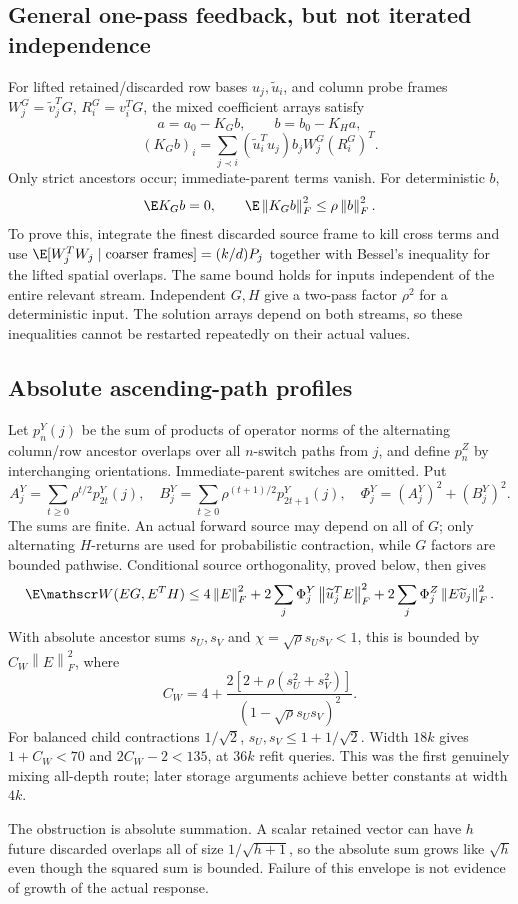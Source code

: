 \documentclass[11pt,oneside,openany,a4paper]{book}
\numberwithin{equation}{chapter}
\theoremstyle{definition}
\theoremstyle{remark}
\newcommand{\F}[1]{\left\lVert#1\right\rVert_F}
\begin{document}
\subsection{General one-pass feedback, but not iterated independence}
For lifted retained/discarded row bases $u_j,\widetilde u_i$, and column probe frames $W_j^G=\widetilde v_j^TG$, $R_i^G=v_i^TG$, the mixed coefficient arrays satisfy
\[
 a=a_0-K_Gb,\qquad b=b_0-K_Ha,
\]
\[
 (K_Gb)_i=\sum_{j\prec i}(\widetilde u_i^Tu_j)b_jW_j^G(R_i^G)^T.
\]
Only strict ancestors occur; immediate-parent terms vanish. For deterministic $b$,
\[
 \E K_Gb=0,\qquad \E\F{K_Gb}^2\le\rho\F b^2.
\]
To prove this, integrate the finest discarded source frame to kill cross terms and use
$\E[W_j^T W_j\mid\text{coarser frames}]=(k/d)P_j$ together with Bessel's inequality for the lifted spatial overlaps. The same bound holds for inputs independent of the entire relevant stream. Independent $G,H$ give a two-pass factor $\rho^2$ for a deterministic input. The solution arrays depend on both streams, so these inequalities cannot be restarted repeatedly on their actual values.

\subsection{Absolute ascending-path profiles}
Let $p_n^Y(j)$ be the sum of products of operator norms of the alternating column/row ancestor overlaps over all $n$-switch paths from $j$, and define $p_n^Z$ by interchanging orientations. Immediate-parent switches are omitted. Put
\[
 A_j^Y=\sum_{t\ge0}\rho^{t/2}p_{2t}^Y(j),\quad
 B_j^Y=\sum_{t\ge0}\rho^{(t+1)/2}p_{2t+1}^Y(j),\quad
 \Phi_j^Y=(A_j^Y)^2+(B_j^Y)^2.
\]
The sums are finite. An actual forward source may depend on all of $G$; only alternating $H$-returns are used for probabilistic contraction, while $G$ factors are bounded pathwise. Conditional source orthogonality, proved below, then gives
\[
 \E\mathscr W(EG,E^TH)\le4\F E^2+
 2\sum_j\Phi_j^Y\F{\widetilde u_j^TE}^2+
 2\sum_j\Phi_j^Z\F{E\widetilde v_j}^2.
\]
With absolute ancestor sums $s_U,s_V$ and $\chi=\sqrt\rho s_Us_V<1$, this is bounded by $C_W\F E^2$, where
\[
 C_W=4+\frac{2[2+\rho(s_U^2+s_V^2)]}{(1-\sqrt\rho s_Us_V)^2}.
\]
For balanced child contractions $1/\sqrt2$, $s_U,s_V\le1+1/\sqrt2$. Width $18k$ gives $1+C_W<70$ and $2C_W-2<135$, at $36k$ refit queries. This was the first genuinely mixing all-depth route; later storage arguments achieve better constants at width $4k$.

The obstruction is absolute summation. A scalar retained vector can have $h$ future discarded overlaps all of size $1/\sqrt{h+1}$, so the absolute sum grows like $\sqrt h$ even though the squared sum is bounded. Failure of this envelope is not evidence of growth of the actual response.
\end{document}
